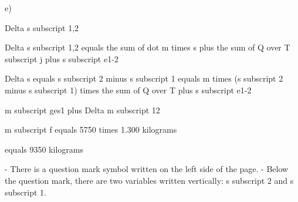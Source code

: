 e)

Delta s subscript 1,2

Delta s subscript 1,2 equals the sum of dot m times s plus the sum of Q over T subscript j plus s subscript e1-2

Delta s equals s subscript 2 minus s subscript 1 equals m times (s subscript 2 minus s subscript 1) times the sum of Q over T plus s subscript e1-2

m subscript ges1 plus Delta m subscript 12

m subscript f equals 5750 times 1.300 kilograms

equals 9350 kilograms

- There is a question mark symbol written on the left side of the page.
- Below the question mark, there are two variables written vertically: s subscript 2 and s subscript 1.